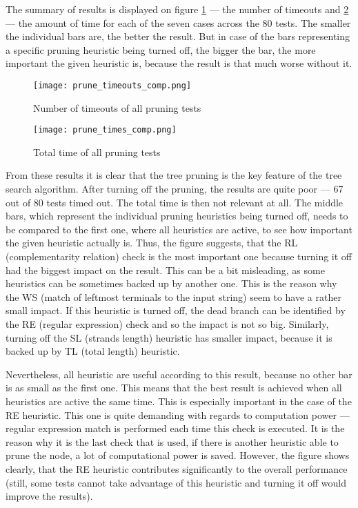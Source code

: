 The summary of results is displayed on figure \ref{fig:prune_timeouts_comp} --- the number of timeouts and \ref{fig:prune_times_comp} --- the amount of time for each of the seven cases across the 80 tests. The smaller the individual bars are, the better the result. But in case of the bars representing a specific pruning heuristic being turned off, the bigger the bar, the more important the given heuristic is, because the result is that much worse without it.

\begin{figure}[h!]
  \texttt{[image: prune\_timeouts\_comp.png]}
  \caption{Number of timeouts of all pruning tests}
  \label{fig:prune_timeouts_comp}
\end{figure}

\begin{figure}[h!]
  \texttt{[image: prune\_times\_comp.png]}
  \caption{Total time of all pruning tests}
  \label{fig:prune_times_comp}
\end{figure}


From these results it is clear that the tree pruning is the key feature of the tree search algorithm. After turning off the pruning, the results are quite poor --- 67 out of 80 tests timed out. The total time is then not relevant at all. The middle bars, which represent the individual pruning heuristics being turned off, needs to be compared to the first one, where all heuristics are active, to see how important the given heuristic actually is. Thus, the figure suggests, that the RL (complementarity relation) check is the most important one because turning it off had the biggest impact on the result. This can be a bit misleading, as some heuristics can be sometimes backed up by another one. This is the reason why the WS (match of leftmost terminals to the input string) seem to have a rather small impact. If this heuristic is turned off, the dead branch can be identified by the RE (regular expression) check and so the impact is not so big. Similarly, turning off the SL (strands length) heuristic has smaller impact, because it is backed up by TL (total length) heuristic.

Nevertheless, all heuristic are useful according to this result, because no other bar is as small as the first one. This means that the best result is achieved when all heuristics are active the same time. This is especially important in the case of the RE heuristic. This one is quite demanding with regards to computation power --- regular expression match is performed each time this check is executed. It is the reason why it is the last check that is used, if there is another heuristic able to prune the node, a lot of computational power is saved. However, the figure shows clearly, that the RE heuristic contributes significantly to the overall performance (still, some tests cannot take advantage of this heuristic and turning it off would improve the results).


